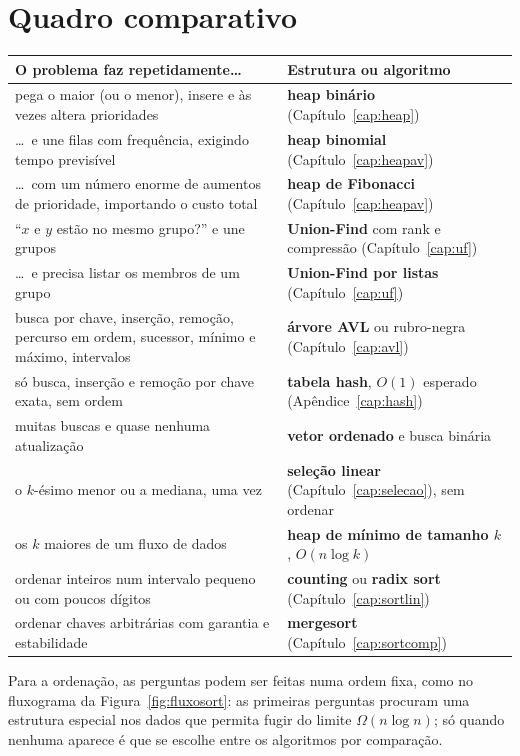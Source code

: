 \section{Quadro comparativo}\label{sec:escolhageral}
\begin{center}
\small
\begin{tabularx}{\linewidth}{@{}XX@{}}
\toprule
O problema faz repetidamente\dots & Estrutura ou algoritmo\\
\midrule
pega o maior (ou o menor), insere e às vezes altera prioridades & \textbf{heap binário} (Capítulo~\ref{cap:heap})\\
\dots\ e une filas com frequência, exigindo tempo previsível & \textbf{heap binomial} (Capítulo~\ref{cap:heapav})\\
\dots\ com um número enorme de aumentos de prioridade, importando o custo total & \textbf{heap de Fibonacci} (Capítulo~\ref{cap:heapav})\\
``$x$ e $y$ estão no mesmo grupo?'' e une grupos & \textbf{Union-Find} com rank e compressão (Capítulo~\ref{cap:uf})\\
\dots\ e precisa listar os membros de um grupo & \textbf{Union-Find por listas} (Capítulo~\ref{cap:uf})\\
busca por chave, inserção, remoção, percurso em ordem, sucessor, mínimo e máximo, intervalos & \textbf{árvore AVL} ou rubro-negra (Capítulo~\ref{cap:avl})\\
só busca, inserção e remoção por chave exata, sem ordem & \textbf{tabela hash}, $O(1)$ esperado (Apêndice~\ref{cap:hash})\\
muitas buscas e quase nenhuma atualização & \textbf{vetor ordenado} e busca binária\\
o $k$-ésimo menor ou a mediana, uma vez & \textbf{seleção linear} (Capítulo~\ref{cap:selecao}), sem ordenar\\
os $k$ maiores de um fluxo de dados & \textbf{heap de mínimo de tamanho $k$}, $O(n\log k)$\\
ordenar inteiros num intervalo pequeno ou com poucos dígitos & \textbf{counting} ou \textbf{radix sort} (Capítulo~\ref{cap:sortlin})\\
ordenar chaves arbitrárias com garantia e estabilidade & \textbf{mergesort} (Capítulo~\ref{cap:sortcomp})\\
\bottomrule
\end{tabularx}
\end{center}

Para a ordenação, as perguntas podem ser feitas numa ordem fixa, como no fluxograma da Figura~\ref{fig:fluxosort}: as primeiras perguntas procuram uma estrutura especial nos dados que permita fugir do limite $\Omega(n\log n)$; só quando nenhuma aparece é que se escolhe entre os algoritmos por comparação.


